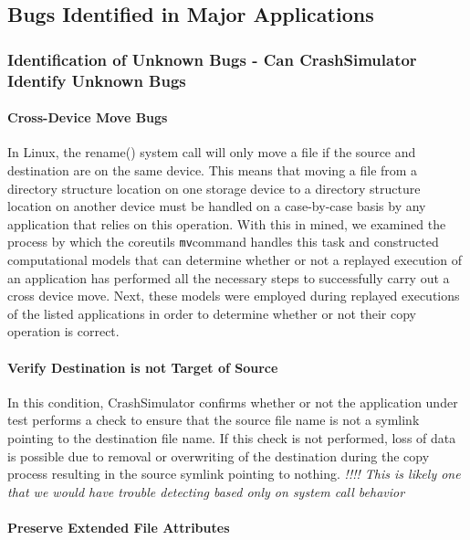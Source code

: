 \subsection{Bugs Identified in Major Applications}

\subsubsection{Identification of Unknown Bugs - Can CrashSimulator Identify Unknown Bugs}

        \paragraph{Cross-Device Move Bugs}

        In Linux, the rename() system call will only move a file if the source and destination are on the same device.
        This means that moving a file from a directory structure location on one storage device to a directory structure location on
        another device must be handled on a case-by-case basis by any application that relies on this operation.  With
        this in mined, we examined the process by which the coreutils {\tt mv}command handles this task and constructed
        computational models that can determine whether or not a replayed execution of an application has performed all
        the necessary steps to successfully carry out a cross device move.  Next, these models were employed during
        replayed executions of the listed applications in order to determine whether or not their copy operation is correct.

        \paragraph{Verify Destination is not Target of Source}

        In this condition, CrashSimulator confirms whether or not the application under test performs a check to ensure
        that the source file name is not a symlink pointing to the destination file name.  If this check is not
        performed, loss of data is possible due to removal or overwriting of the destination during the copy process
        resulting in the source symlink pointing to nothing. \emph{!!!! This is likely one that we would have trouble
          detecting based only on system call behavior}

        \paragraph{Preserve Extended File Attributes}

